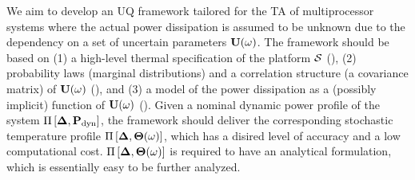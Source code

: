 We aim to develop an UQ framework tailored for the TA of multiprocessor systems where the actual power dissipation is assumed to be unknown due to the dependency on a set of uncertain parameters $\mathbf{U}(\omega)$. The framework should be based on (1) a high-level thermal specification of the platform $\mathcal{S}$ (), (2) probability laws (marginal distributions) and a correlation structure (a covariance matrix) of $\mathbf{U}(\omega)$ (), and (3) a model of the power dissipation as a (possibly implicit) function of $\mathbf{U}(\omega)$ (). Given a nominal dynamic power profile of the system $\prof{\mP_\dyn}$, the framework should deliver the corresponding stochastic temperature profile $\Pi\left[\boldsymbol{\Delta}, {\boldsymbol\Theta}(\omega)\right]$, which has a disired level of accuracy and a low computational cost. $\Pi\left[\boldsymbol{\Delta}, {\boldsymbol\Theta}(\omega)\right]$ is required to have an analytical formulation, which is essentially easy to be further analyzed.
